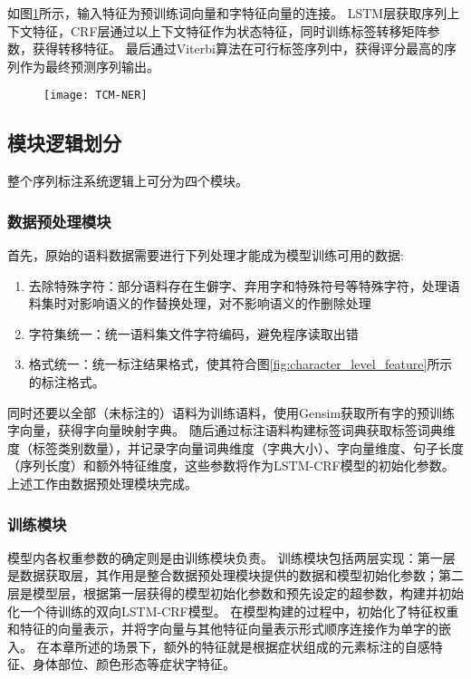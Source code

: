 如图\ref{fig:TCM_NER}所示，输入特征为预训练词向量和字特征向量的连接。
LSTM层获取序列上下文特征，CRF层通过以上下文特征作为状态特征，同时训练标签转移矩阵参数，获得转移特征。
最后通过Viterbi算法在可行标签序列中，获得评分最高的序列作为最终预测序列输出。

\begin{figure}[H]
    \centering
    \texttt{[image: TCM-NER]}
    \label{fig:TCM_NER}
\end{figure}

\subsection{模块逻辑划分}

整个序列标注系统逻辑上可分为四个模块。
\subsubsection{数据预处理模块}
首先，原始的语料数据需要进行下列处理才能成为模型训练可用的数据:
\begin{enumerate}[leftmargin=*]
    \item 去除特殊字符：部分语料存在生僻字、弃用字和特殊符号等特殊字符，处理语料集时对影响语义的作替换处理，对不影响语义的作删除处理
    \item 字符集统一：统一语料集文件字符编码，避免程序读取出错
    \item 格式统一：统一标注结果格式，使其符合图\ref{fig:character_level_feature}所示的标注格式。
\end{enumerate}

同时还要以全部（未标注的）语料为训练语料，使用Gensim获取所有字的预训练字向量，获得字向量映射字典。
随后通过标注语料构建标签词典获取标签词典维度（标签类别数量），并记录字向量词典维度（字典大小）、字向量维度、句子长度（序列长度）和额外特征维度，这些参数将作为LSTM-CRF模型的初始化参数。
上述工作由数据预处理模块完成。
\subsubsection{训练模块}
模型内各权重参数的确定则是由训练模块负责。
训练模块包括两层实现：第一层是数据获取层，其作用是整合数据预处理模块提供的数据和模型初始化参数；第二层是模型层，根据第一层获得的模型初始化参数和预先设定的超参数，构建并初始化一个待训练的双向LSTM-CRF模型。
在模型构建的过程中，初始化了特征权重和特征的向量表示，并将字向量与其他特征向量表示形式顺序连接作为单字的嵌入。
在本章所述的场景下，额外的特征就是根据症状组成的元素标注的自感特征、身体部位、颜色形态等症状字特征。

